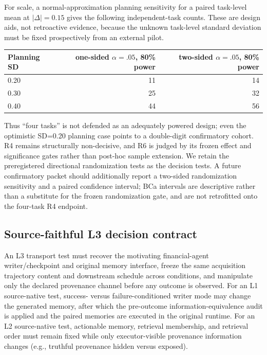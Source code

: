 For scale, a normal-approximation planning sensitivity for a paired task-level mean at $|\Delta|=0.15$ gives the following independent-task counts. These are design aids, not retroactive evidence, because the unknown task-level standard deviation must be fixed prospectively from an external pilot.
\begin{center}
\begin{tabular}{lrr}
\toprule
Planning SD & one-sided $\alpha=.05$, 80\% power & two-sided $\alpha=.05$, 80\% power \\
\midrule
0.20 & 11 & 14 \\
0.30 & 25 & 32 \\
0.40 & 44 & 56 \\
\bottomrule
\end{tabular}
\end{center}
Thus ``four tasks'' is not defended as an adequately powered design; even the optimistic SD=0.20 planning case points to a double-digit confirmatory cohort. R4 remains structurally non-decisive, and R6 is judged by its frozen effect and significance gates rather than post-hoc sample extension. We retain the preregistered directional randomization tests as the decision tests. A future confirmatory packet should additionally report a two-sided randomization sensitivity and a paired confidence interval; BCa intervals are descriptive rather than a substitute for the frozen randomization gate, and are not retrofitted onto the four-task R4 endpoint.

\subsection{Source-faithful L3 decision contract}
\label{app:l3}
An L3 transport test must recover the motivating financial-agent writer/checkpoint and original memory interface, freeze the same acquisition trajectory content and downstream schedule across conditions, and manipulate only the declared provenance channel before any outcome is observed. For an L1 source-native test, success- versus failure-conditioned writer mode may change the generated memory, after which the pre-outcome information-equivalence audit is applied and the paired memories are executed in the original runtime. For an L2 source-native test, actionable memory, retrieval membership, and retrieval order must remain fixed while only executor-visible provenance information changes (e.g., truthful provenance hidden versus exposed).

